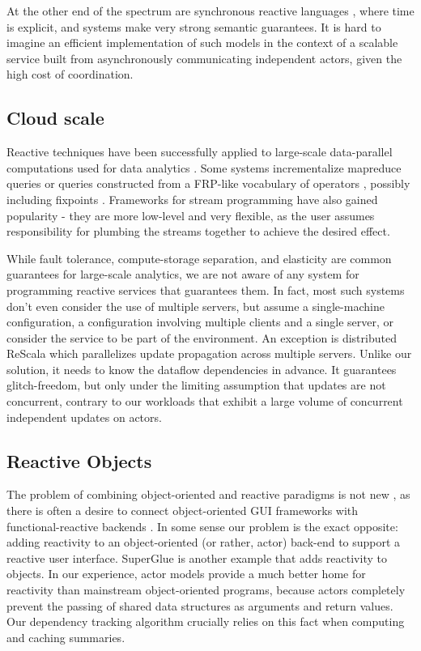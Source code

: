 At the other end of the spectrum are synchronous reactive languages \cite{lustre,signal,esterel,syncdataflow}, where time is explicit, and systems make very strong semantic guarantees. It is hard to imagine an efficient implementation of such models in the context of a scalable service built from asynchronously communicating independent actors, given the high cost of coordination.

\subsection{Cloud scale}

Reactive techniques have been successfully applied to large-scale data-parallel computations used for data analytics \cite{mapreduce,spark}. Some systems incrementalize mapreduce queries\cite{mronline,incoop} or queries constructed from a FRP-like vocabulary of operators \cite{nectar}, possibly including fixpoints \cite{frank}. Frameworks for stream programming \cite{flink} have also gained popularity - they are more low-level and very flexible, as the user assumes responsibility for plumbing the streams together to achieve the desired effect. 

While fault tolerance, compute-storage separation, and elasticity are common guarantees for large-scale analytics, we are not aware of any system for programming reactive services that guarantees them. In fact, most such systems don't even consider the use of multiple servers, but assume a single-machine configuration, a configuration involving multiple clients and a single server, or consider the service to be part of the environment. An exception is distributed ReScala\cite{drescala} which parallelizes update propagation across multiple servers. Unlike our solution, it needs to know the dataflow dependencies in advance. It guarantees glitch-freedom, but only under the limiting assumption that updates are not concurrent, contrary to our workloads that exhibit a large volume of concurrent independent updates on actors.

\subsection{Reactive Objects}

The problem of combining object-oriented and reactive paradigms is not new \cite{Salvaneschi:2013:RBO:2451436.2451442}, as there is often a desire to connect object-oriented GUI frameworks with functional-reactive backends \cite{statelines}. In some sense our problem is the exact opposite: adding reactivity to an object-oriented (or rather, actor) back-end to support a reactive user interface.  SuperGlue \cite{superglue} is another example that adds reactivity to objects. In our experience, actor models provide a much better home for reactivity than mainstream object-oriented programs, because actors completely prevent the passing of shared data structures as arguments and return values. Our dependency tracking algorithm crucially relies on this fact when computing and caching summaries.


